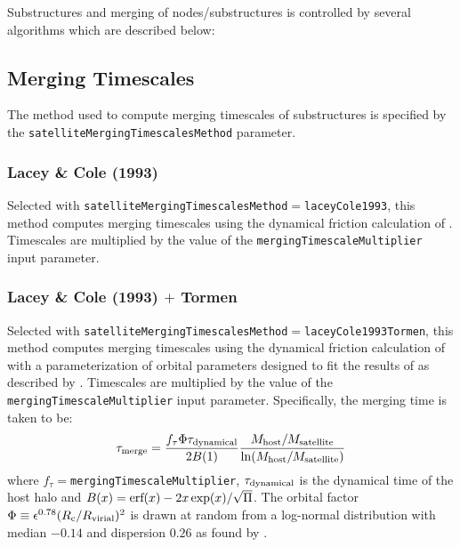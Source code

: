 Substructures and merging of nodes/substructures is controlled by several algorithms which are described below:

\subsection{Merging Timescales}\label{sec:SatelliteMergingTimescales}

The method used to compute merging timescales of substructures is specified by the {\tt satelliteMergingTimescalesMethod} parameter.

\subsubsection{Lacey \& Cole (1993)}\label{phys:satelliteMergingTimescales:satelliteMergingTimescalesLaceyCole1993}

Selected with {\tt satelliteMergingTimescalesMethod}$=${\tt laceyCole1993}, this method computes merging timescales using the dynamical friction calculation of \cite{lacey_merger_1993}. Timescales are multiplied by the value of the {\tt mergingTimescaleMultiplier} input parameter.

\subsubsection{Lacey \& Cole (1993) $+$ Tormen}\label{phys:satelliteMergingTimescales:satelliteMergingTimescalesLaceyCole1993Tormen}

Selected with {\tt satelliteMergingTimescalesMethod}$=${\tt laceyCole1993Tormen}, this method computes merging timescales using the dynamical friction calculation of \cite{lacey_merger_1993} with a parameterization of orbital parameters designed to fit the results of \cite{tormen_rise_1997} as described by \cite{cole_hierarchical_2000}. Timescales are multiplied by the value of the {\tt mergingTimescaleMultiplier} input parameter. Specifically, the merging time is taken to be:
\begin{equation}
 \tau_{\rm merge} = {f_\tau \Phi \tau_{\rm dynamical} \over 2 B(1)} { M_{\rm host}/M_{\rm satellite} \over \ln (M_{\rm host}/M_{\rm satellite})}
\end{equation}
where $f_\tau=${\tt mergingTimescaleMultiplier}, $\tau_{\rm dynamical}$ is the dynamical time of the host halo and $B(x)=\hbox{erf}(x)-2 x \exp(x)/\sqrt{\Pi}$. The orbital factor $\Phi \equiv \epsilon^{0.78} (R_{\rm c}/R_{\rm virial})^2$ is drawn at random from a log-normal distribution with median $-0.14$ and dispersion $0.26$ as found by \cite{cole_hierarchical_2000}.

